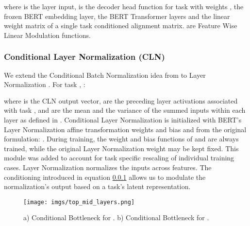 \documentclass{article} \usepackage{iclr2021_conference,times}
\begin{document}
where  is the layer input,  is the decoder head function for task  with weights ,  the frozen BERT embedding layer,  the BERT Transformer layers and  the linear weight matrix of a single task conditioned alignment matrix.  are Feature Wise Linear Modulation functions. 

\subsubsection{Conditional Layer Normalization (CLN)}
\label{sec:cond_layer_norm}

We extend the Conditional Batch Normalization idea from \citet{NIPS2017_7237} to Layer Normalization \citep{DBLP:journals/corr/BaKH16}. For task , :

where  is the CLN output vector,  are the preceding layer activations associated with task ,  and  are the mean and the variance of the summed inputs within each layer as defined in \citet{DBLP:journals/corr/BaKH16}. Conditional Layer Normalization is initialized with BERT's Layer Normalization affine transformation weights and bias  and  from the original formulation: . During training, the weight and bias functions of  and  are always trained, while the original Layer Normalization weight may be kept fixed. This module was added to account for task specific rescaling of individual training cases. Layer Normalization normalizes the inputs across features. The conditioning introduced in equation \ref{sec:cond_layer_norm} allows us to modulate the normalization's output based on a task's latent representation.

\begin{wrapfigure}[13]{r}{0.40\textwidth}
    \vspace{-40pt}
    \begin{center} 
        \texttt{[image: imgs/top\_mid\_layers.png]}
    \caption{\label{fig:modules} \small a) Conditional Bottleneck for . b) Conditional Bottleneck for .}
 \hspace{-5pt}
    \end{center}
\end{wrapfigure}
\end{document}
